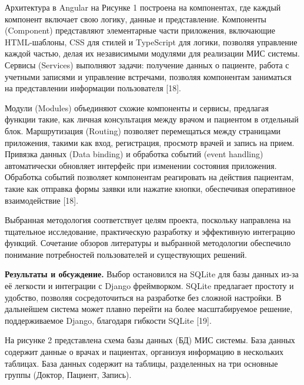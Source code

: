 \begin{multicols}{2}

Архитектура в Angular на Рисунке 1 построена на компонентах, где каждый
компонент включает свою логику, данные и представление. Компоненты
(Component) представляют элементарные части приложения, включающие
HTML-шаблоны, CSS для стилей и TypeScript для логики, позволяя
управление каждой частью, делая их независимыми модулями для реализации
МИС системы. Сервисы (Services) выполняют задачи: получение данных о
пациенте, работа с учетными записями и управление встречами, позволяя
компонентам заниматься на представлении информации пользователя
{[}18{]}.

Модули (Modules) объединяют схожие компоненты и сервисы, предлагая
функции такие, как личная консультация между врачом и пациентом в
отдельный блок. Маршрутизация (Routing) позволяет перемещаться между
страницами приложения, такими как вход, регистрация, просмотр врачей и
запись на прием. Привязка данных (Data binding) и обработка событий
(event handling) автоматически обновляет интерфейс при изменении
состояния приложения. Обработка событий позволяет компонентам
реагировать на действия пациентам, такие как отправка формы заявки или
нажатие кнопки, обеспечивая оперативное взаимодействие {[}18{]}.

Выбранная методология соответствует целям проекта, поскольку направлена
на тщательное исследование, практическую разработку и эффективную
интеграцию функций. Сочетание обзоров литературы и выбранной методологии
обеспечило понимание потребностей пользователей и существующих решений.

{\bfseries Результаты и обсуждение.} Выбор остановился на SQLite для базы
данных из-за её легкости и интеграции с Django фреймворком. SQLite
предлагает простоту и удобство, позволяя сосредоточиться на разработке
без сложной настройки. В дальнейшем система может плавно перейти на
более масштабируемое решение, поддерживаемое Django, благодаря гибкости
SQLite {[}19{]}.

На рисунке 2 представлена схема базы данных (БД) МИС системы. База
данных содержит данные о врачах и пациентах, организуя информацию в
нескольких таблицах. База данных содержит на таблицы, разделенных на три
основные группы (Доктор, Пациент, Запись).
\end{multicols}

